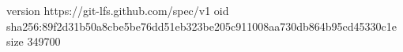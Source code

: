 version https://git-lfs.github.com/spec/v1
oid sha256:89f2d31b50a8cbe5be76dd51eb323be205c911008aa730db864b95cd45330c1e
size 349700
